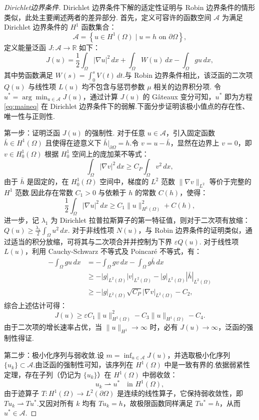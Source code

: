\begin{proof}[Dirichlet边界条件]
Dirichlet 边界条件下解的适定性证明与 Robin 边界条件的情形类似，此处主要阐述两者的差异部分.
首先，定义可容许的函数空间 $\mathcal{A}$ 为满足 Dirichlet 边界条件的 $H^1$ 函数集合：
$$\mathcal{A} = \left\{ u \in H^1(\Omega) \mid u = h \text{ on } \partial \Omega  \right\},$$
定义能量泛函 $J: \mathcal{A} \to \mathbb{R}$ 如下：
$$J(u) = \frac{1}{2}\int_{\Omega} |\nabla u|^2 \, dx + \int_{\Omega} W(u) \, dx - \int_{\Omega} gu \, dx,$$
其中势函数满足 $W(s) = \int_0^s V(t) \, dt$.与 Robin 边界条件相比，该泛函的二次项 $Q(u)$ 与线性项 $L(u)$ 均不包含与惩罚参数 $\mu$ 相关的边界积分项.
令 $u^{*} = \arg\min_{u \in \mathcal{A}} J(u)$，通过计算 $J(u)$ 的 Gâteaux 变分可知，$u^{*}$ 即为方程 \eqref{eq:maineq} 在 Dirichlet 边界条件下的弱解.下面分步证明该极小值点的存在性、唯一性与正则性.

第一步：证明泛函 $J(u)$ 的强制性. 
对于任意 $u \in \mathcal{A}$，引入固定函数 $\bar{h} \in H^1(\Omega)$ 且使得在迹意义下 $\bar{h}|_{\partial \Omega} = h$.令 $v = u - \bar{h}$，显然在边界上 $v=0$，即 $v \in H^1_0(\Omega)$
根据 $H^1_0$ 空间上的庞加莱不等式：
$$\int_{\Omega} |\nabla v|^2 \, dx \ge C_P \int_{\Omega} v^2 \, dx,$$
由于 $\bar{h}$ 是固定的，在 $H^1_0(\Omega)$ 空间中，梯度的 $L^2$ 范数 $\|\nabla v\|_{L^2}$ 等价于完整的 $H^1$ 范数.因此存在常数 $C_1 > 0$ 与依赖于 $h$ 的常数 $C(h)$，使得：
$$\frac{1}{2}\int_{\Omega} |\nabla u|^2 \, dx \ge C_1 \|u\|_{H^1(\Omega)}^2 + C(h),$$
进一步，记 $\lambda_1$ 为 Dirichlet 拉普拉斯算子的第一特征值，则对于二次项有放缩：$Q(u) \ge \frac{\lambda_1}{2} \int_{\Omega} u^2 \, dx$.
对于非线性项 $N(u)$，与 Robin 边界条件的证明类似，通过适当的积分放缩，可将其与二次项合并并控制为下界 $\varepsilon Q(u)$.
对于线性项 $L(u)$，利用 Cauchy-Schwarz 不等式及 Poincaré 不等式，有：
$$\begin{aligned}
-\int_{\Omega} gu \, dx &= -\int_{\Omega} gv \, dx - \int_{\Omega} g\bar{h} \, dx \\
&\ge -|g|_{L^2(\Omega)} |v|_{L^2(\Omega)} - |g|_{L^2(\Omega)} |\bar{h}|_{L^2(\Omega)} \\
&\ge -|g|_{L^2(\Omega)} \sqrt{C_P} |\nabla v|_{L^2(\Omega)} - C_2,
\end{aligned}$$
综合上述估计可得：
$$J(u) \ge \varepsilon C_1 \|u\|_{H^1(\Omega)}^2 - C_3 \|u\|_{H^1(\Omega)} - C_4.$$
由于二次项的增长速率占优，当 $\|u\|_{H^1} \to \infty$ 时，必有 $J(u) \to \infty$，泛函的强制性得证.

第二步：极小化序列与弱收敛.设 $m = \inf_{u \in \mathcal{A}} J(u)$，并选取极小化序列 $\{u_k\} \subset \mathcal{A}$.由泛函的强制性可知，该序列在 $H^1(\Omega)$ 中是一致有界的.依据弱紧性定理，存在子列（仍记为 $\{u_k\}$）在 $H^1(\Omega)$ 中弱收敛：
$$u_k \rightharpoonup u^* \quad \text{in } H^1(\Omega),$$
由于迹算子 $T: H^1(\Omega) \to L^2(\partial \Omega)$ 是连续的线性算子，它保持弱收敛性，即 $Tu_k \rightharpoonup Tu^*$.又因对所有 $k$ 均有 $Tu_k = h$，故极限函数同样满足 $Tu^* = h$，从而 $u^* \in \mathcal{A}$.


\end{proof}

